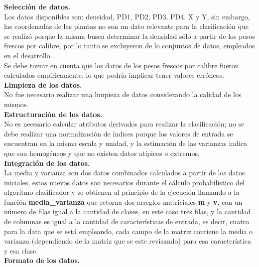 \noindent
\textbf{Selección de datos.}\\

Los datos disponibles son: densidad, PD1, PD2, PD3, PD4, X y Y, sin embargo, las coordenadas de las
plantas no son un dato relevante para la clasificación que se realizó porque la misma busca determinar
la densidad sólo a partir de los pesos frescos por calibre, por lo tanto se excluyeron de lo conjuntos  de datos, empleados en el desarrollo.\\

Se debe tomar en cuenta que los datos de los pesos frescos por calibre fueron calculados empíricamente, lo que podría implicar tener valores erróneos.\\

\noindent
\textbf{Limpieza de los datos.}\\

No fue necesario realizar una limpieza de datos considerando la calidad de los mismos.\\

\noindent
\textbf{Estructuración de los datos.}\\

No es necesario calcular atributos derivados para realizar la clasificación; no se debe realizar
una normalización de índices porque los valores de entrada se encuentran en la misma escala y unidad, y la estimación de las varianzas indica que son homogéneos y que no existen datos atípicos o extremos.\\

\noindent
\textbf{Integración de los datos.}\\

La media y varianza son dos datos combinados calculados a partir de los datos iniciales, estos nuevos
datos son necesarios durante el cálculo probabilístico del algoritmo clasificador y se
obtienen al principio de la ejecución llamando a la función \textbf{media\_varianza} que retorna
dos arreglos matriciales \textbf{m} y \textbf{v}, con un número de filas igual a la cantidad de clases, en este caso tres filas,
y la cantidad de columnas es igual a la cantidad de características de entrada, es decir, cuatro
para la data que se está empleando, cada campo de la matriz contiene la media o varianza (dependiendo de la
matriz que se este revisando) para esa característica y esa clase.\\

\noindent
\textbf{Formato de los datos.}\\

